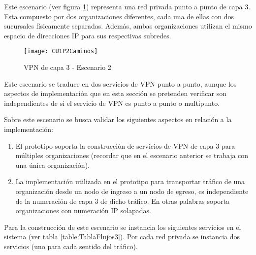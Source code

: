 Este escenario (ver figura \ref{fig:CUP2}) representa una red privada punto a punto de capa 3. Esta compuesto por dos organizaciones diferentes, cada una de ellas con dos sucursales f\'isicamente separadas. Adem\'as, ambas organizaciones utilizan el mismo espacio de direcciones IP para sus respectivas subredes.\\

\begin{figure}[h!] 
\centering    
\texttt{[image: CU1P2Caminos]}
\caption[VPN de capa 3 - Escenario 2]{VPN de capa 3 - Escenario 2}
\label{fig:CUP2}
\end{figure}


Este escenario se traduce en dos servicios de VPN punto a punto, aunque los aspectos de implementaci\'on que en esta secci\'on se pretenden verificar son independientes de si el servicio de VPN es punto a punto o multipunto.

Sobre este escenario se busca validar los siguientes aspectos en relaci\'on a la implementaci\'on:

\begin{enumerate}
\item El prototipo soporta la construcci\'on de servicios de VPN de capa 3 para múltiples organizaciones (recordar que en el escenario anterior se trabaja con una \'unica organización).

\item La implementaci\'on utilizada en el prototipo para transportar tr\'afico de una organización desde un nodo de ingreso a un nodo de egreso, es independiente de la numeraci\'on de capa 3 de dicho tr\'afico. En otras palabras soporta organizaciones con numeraci\'on IP solapadas.
\end{enumerate}

Para la construcci\'on de este escenario se instancia los siguientes servicios en el sistema (ver tabla \ref{table:TablaFlujos3}). Por cada red privada se instancia dos servicios (uno para cada sentido del tr\'afico).

